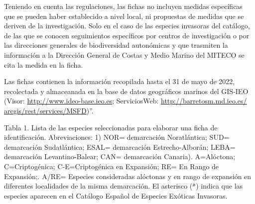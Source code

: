 \documentclass{article}
\begin{document}
Teniendo en cuenta las regulaciones, las fichas no incluyen medidas específicas que se pueden haber establecido a nivel local, ni propuestas de medidas que se deriven de la investigación. Solo en el caso de las especies invasoras del catálogo, de las que se conocen seguimientos específicos por centros de investigación o por las direcciones generales de biodiversidad autonómicas y que trasmiten la información  a la Dirección General de Costas y Medio Marino del MITECO se cita la medida en la ficha.\par 
Las fichas contienen la información recopilada hasta el 31 de mayo de 2022, recolectada y almaceanada en la base de datos geográficos marinos del GIS-IEO (Visor: \url{http://www.ideo-base.ieo.es}; ServiciosWeb: \url{http://barretosm.md.ieo.es/ arcgis/rest/services/MSFD})”.\par
Tabla 1. Lista de las especies seleccionadas para elaborar una ficha de identificación. Abreviaciones: 1) NOR= demarcación Noratlántica; SUD= demarcación Sudatlántica; ESAL= demarcación Estrecho-Alborán; LEBA= demarcación Levantino-Balear; CAN= demarcación Canaria).  A=Alóctona; C=Criptogénica; C-E=Criptogénica en Expansión; RE= En Rango de Expansión;. A/RE= Especies consideradas alóctonas y en rango de expansión en diferentes localidades de la misma demarcación. El asterisco (*) indica que las especies aparecen en el Catálogo Español de Especies Exóticas Invasoras.
\clearpage
\end{document}

